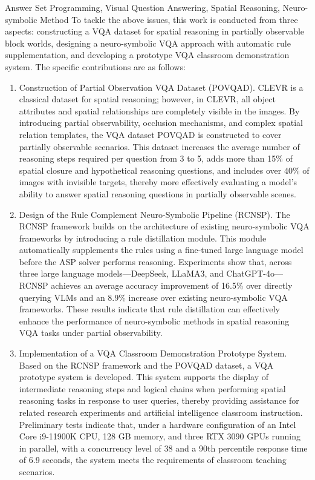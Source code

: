 \begin{englishabstract}{Answer Set Programming, Visual Question Answering, Spatial Reasoning, Neuro-symbolic Method}
To tackle the above issues, this work is conducted from three aspects: constructing a VQA dataset for spatial reasoning in partially observable block worlds, designing a neuro-symbolic VQA approach with automatic rule supplementation, and developing a prototype VQA classroom demonstration system. The specific contributions are as follows:
\begin{enumerate}[itemsep=0pt, parsep=0pt]
\item Construction of Partial Observation VQA Dataset (POVQAD).
CLEVR is a classical dataset for spatial reasoning; however, in CLEVR, 
all object attributes and spatial relationships are completely visible in the images. 
By introducing partial observability, occlusion mechanisms, and complex spatial relation templates, 
the VQA dataset POVQAD is constructed to cover partially observable scenarios. 
This dataset increases the average number of reasoning steps required per question from 3 to 5, 
adds more than 15\% of spatial closure and hypothetical reasoning questions, 
and includes over 40\% of images with invisible targets, 
thereby more effectively evaluating a model’s ability to answer spatial reasoning questions in partially observable scenes.
\item Design of the Rule Complement Neuro-Symbolic Pipeline (RCNSP).
The RCNSP framework builds on the architecture of existing neuro-symbolic VQA frameworks by introducing 
a rule distillation module. This module automatically supplements the rules using a fine-tuned large language 
model before the ASP solver performs reasoning. Experiments show that, across three large language models—DeepSeek, 
LLaMA3, and ChatGPT-4o—RCNSP achieves an average accuracy improvement 
of 16.5\% over directly querying VLMs and an 8.9\% increase over existing neuro-symbolic VQA frameworks. 
These results indicate that rule distillation can effectively enhance the performance of neuro-symbolic methods 
in spatial reasoning VQA tasks under partial observability.
\item Implementation of a VQA Classroom Demonstration Prototype System. 
Based on the RCNSP framework and the POVQAD dataset, a VQA prototype system is developed. 
This system supports the display of intermediate reasoning steps and logical chains when performing spatial reasoning
 tasks in response to user queries, thereby providing assistance for related research experiments and artificial 
 intelligence classroom instruction. Preliminary tests indicate that, under a hardware configuration of 
 an Intel Core i9-11900K CPU, 128 GB memory, and three RTX 3090 GPUs running in parallel, 
 with a concurrency level of 38 and a 90th percentile response time of 6.9 seconds, 
 the system meets the requirements of classroom teaching scenarios.
\end{enumerate}
\end{englishabstract}

\tableofcontents
\listofothers
